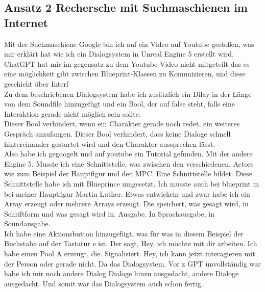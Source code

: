 {\subsection{Ansatz 2 Rechersche mit Suchmaschienen im Internet}
Mit der Suchmaschiene Google bin ich auf ein Video auf Youtube gestoßen, was mir erklärt hat wie ich ein Dialogsystem in Unreal Engine 5 erstellt wird.
\\
ChatGPT hat mir im gegensatz zu dem Youtube-Video nicht mitgeteilt das es eine möglichkeit gibt zwischen Blueprint-Klassen zu Komunizieren, und diese geschieht über Interf
\\
Zu dem beschriebenen Dialogsystem habe ich zusätzlich ein Dilay in der Länge von dem Soundfile hinzugefügt und ein Bool, der auf false steht, falls eine Interaktion gerade nicht möglich sein sollte.
\\
Dieser Bool verhindert, wenn ein Charakter gerade noch redet, ein weiteres Gespräch anzufangen. Dieser Bool verhindert, dass keine Dialoge schnell hintereinander gestartet wird und den Charakter aussprechen lässt.
\\
Also habe ich gegoogelt und auf youtube ein Tutorial gefunden.  	 Mit der andere Engine 5. Musste ich eine Schnittstelle, was zwischen den verschiedenen.  Actors wie zum Beispiel der Hauptfigur und den MPC.  Eine Schnittstelle bildet.    		 Diese Schnittstelle habe ich mit Blueprince umgesetzt. Ich musste auch bei blueprint m bei meiner Hauptfigur Martin Luther.  	 Etwas entwickeln und zwar habe ich ein Array erzeugt oder mehrere Arrays erzeugt. Die speichert, was gesagt wird, in Schriftform und was gesagt wird in.   Ausgabe.  In Sprachausgabe, in Soundausgabe.
\\
Ich habe eine Aktionsbutton hinzugefügt, was für was in diesem Beispiel der Buchstabe auf der Tastatur e ist.  Der sagt, Hey, ich möchte mit dir arbeiten.		 Ich habe einen Pool A erzeugt, die. Signalisiert. Hey, ich kann jetzt interagieren mit der Person oder gerade nicht.   		 Da das Dialogsystem. Vor z GPT unvollständig war habe ich mir noch andere Dialog Dialoge hinzu ausgedacht, andere Dialoge ausgedacht.  Und somit war das Dialogsystem auch schon fertig.



}
